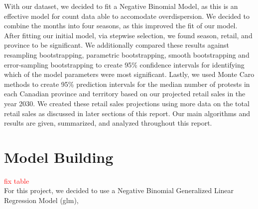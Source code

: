 \documentclass[12pt]{article}
\begin{document}
With our dataset, we decided to fit a Negative Binomial Model, as this is an effective model for count data able to accomodate overdispersion. We decided to combine the months into four seasons, as this improved the fit of our model. After fitting our initial model, via stepwise selection, we found season, retail, and province to be significant. We additionally compared these results against resampling bootstrapping, parametric bootstrapping, smooth bootstrapping and error-sampling bootstrapping to create 95\% confidence intervals for identifying which of the model parameters were most significant. Lastly, we used Monte Caro methods to create 95\% prediction intervals for the median number of protests in each Canadian province and territory based on our projected retail sales in the year 2030. We created these retail sales projections using more data on the total retail sales as discussed in later sections of this report.
Our main algorithms and results are given, summarized, and analyzed throughout this report.

\newpage
\section{Model Building}
\textcolor{red}{fix table}\\
For this project, we decided to use a Negative Binomial Generalized Linear Regression Model (glm),
\end{document}
